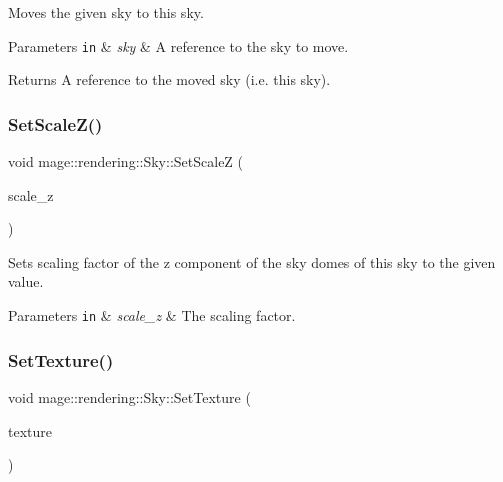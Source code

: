 Moves the given sky to this sky.


\begin{DoxyParams}[1]{Parameters}
\mbox{\tt in}  & {\em sky} & A reference to the sky to move. \\
\hline
\end{DoxyParams}
\begin{DoxyReturn}{Returns}
A reference to the moved sky (i.\+e. this sky). 
\end{DoxyReturn}
\hypertarget{classmage_1_1rendering_1_1_sky_a92fcaf3c89a39fd97a37ab61adf1c194}{}\label{classmage_1_1rendering_1_1_sky_a92fcaf3c89a39fd97a37ab61adf1c194} 
\subsubsection{\texorpdfstring{Set\+Scale\+Z()}{SetScaleZ()}}
{\footnotesize\ttfamily void mage\+::rendering\+::\+Sky\+::\+Set\+ScaleZ (\begin{DoxyParamCaption}\item[{\hyperlink{namespacemage_aa97e833b45f06d60a0a9c4fc22ae02c0}{F32}}]{scale\+\_\+z }\end{DoxyParamCaption})\hspace{0.3cm}{\ttfamily [noexcept]}}

Sets scaling factor of the z component of the sky domes of this sky to the given value.


\begin{DoxyParams}[1]{Parameters}
\mbox{\tt in}  & {\em scale\+\_\+z} & The scaling factor. \\
\hline
\end{DoxyParams}
\hypertarget{classmage_1_1rendering_1_1_sky_aca571c68ad345801051fcc36e32013e6}{}\label{classmage_1_1rendering_1_1_sky_aca571c68ad345801051fcc36e32013e6} 
\subsubsection{\texorpdfstring{Set\+Texture()}{SetTexture()}}
{\footnotesize\ttfamily void mage\+::rendering\+::\+Sky\+::\+Set\+Texture (\begin{DoxyParamCaption}\item[{\hyperlink{namespacemage_1_1rendering_a6f3ae54f825328465b0cdde0f0de4a36}{Texture\+Ptr}}]{texture }\end{DoxyParamCaption})}

